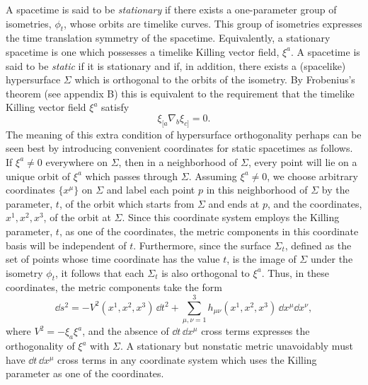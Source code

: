 A spacetime is said to be \emph{stationary} if there exists a one-parameter group
of isometries, \(\phi_t\), whose orbits are timelike curves. This group of
isometries expresses the time translation symmetry of the spacetime. Equivalently,
a stationary spacetime is one which possesses a timelike Killing vector field,
\(\xi^a\). A spacetime is said to be \emph{static} if it is stationary and if, in
addition, there exists a (spacelike) hypersurface \(\Sigma\) which is orthogonal to
the orbits of the isometry. By Frobenius's theorem (see appendix B) this is
equivalent to the requirement that the timelike Killing vector field \(\xi^a\)
satisfy
\begin{equation}
  \xi_{[a}\nabla_b\xi_{c]}=0 .
  \tag{6.1.1}\label{eq:6.1.1}
\end{equation}
The meaning of this extra condition of hypersurface orthogonality perhaps can be
seen best by introducing convenient coordinates for static spacetimes as follows.
If \(\xi^a\ne0\) everywhere on \(\Sigma\), then in a neighborhood of \(\Sigma\),
every point will lie on a unique orbit of \(\xi^a\) which passes through
\(\Sigma\). Assuming \(\xi^a\ne0\), we choose arbitrary coordinates
\(\{x^\mu\}\) on \(\Sigma\) and label each point \(p\) in this neighborhood of
\(\Sigma\) by the parameter, \(t\), of the orbit which starts from \(\Sigma\) and
ends at \(p\), and the coordinates, \(x^1,x^2,x^3\), of the orbit at \(\Sigma\).
Since this coordinate system employs the Killing parameter, \(t\), as one of the
coordinates, the metric components in this coordinate basis will be independent
of \(t\). Furthermore, since the surface \(\Sigma_t\), defined as the set of points
whose time coordinate has the value \(t\), is the image of \(\Sigma\) under the
isometry \(\phi_t\), it follows that each \(\Sigma_t\) is also orthogonal to
\(\xi^a\). Thus, in these coordinates, the metric components take the form
\begin{equation}
  \dd s^2=-V^2(x^1,x^2,x^3)\,\dd t^2+
  \sum_{\mu,\nu=1}^{3}h_{\mu\nu}(x^1,x^2,x^3)\,\dd x^\mu \dd x^\nu ,
  \tag{6.1.2}\label{eq:6.1.2}
\end{equation}
where \(V^2=-\xi_a\xi^a\), and the absence of \(\dd t\,\dd x^\mu\) cross terms
expresses the orthogonality of \(\xi^a\) with \(\Sigma\). A stationary but
nonstatic metric unavoidably must have \(\dd t\,\dd x^\mu\) cross terms in any
coordinate system which uses the Killing parameter as one of the coordinates.


